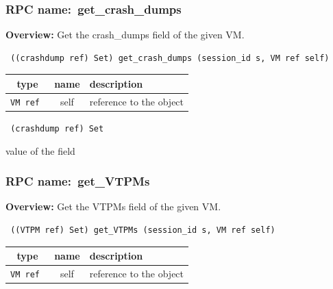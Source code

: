 \subsubsection{RPC name:~get\_crash\_dumps}

{\bf Overview:} 
Get the crash\_dumps field of the given VM.

\begin{verbatim} ((crashdump ref) Set) get_crash_dumps (session_id s, VM ref self)\end{verbatim}



 
\vspace{0.3cm}
\begin{tabular}{|c|c|p{7cm}|}
 \hline
{\bf type} & {\bf name} & {\bf description} \\ \hline
{\tt VM ref } & self & reference to the object \\ \hline 

\end{tabular}

\vspace{0.3cm}

{\tt 
(crashdump ref) Set
}


value of the field
\vspace{0.3cm}
\vspace{0.3cm}
\vspace{0.3cm}
\subsubsection{RPC name:~get\_VTPMs}

{\bf Overview:} 
Get the VTPMs field of the given VM.

\begin{verbatim} ((VTPM ref) Set) get_VTPMs (session_id s, VM ref self)\end{verbatim}



 
\vspace{0.3cm}
\begin{tabular}{|c|c|p{7cm}|}
 \hline
{\bf type} & {\bf name} & {\bf description} \\ \hline
{\tt VM ref } & self & reference to the object \\ \hline 

\end{tabular}

